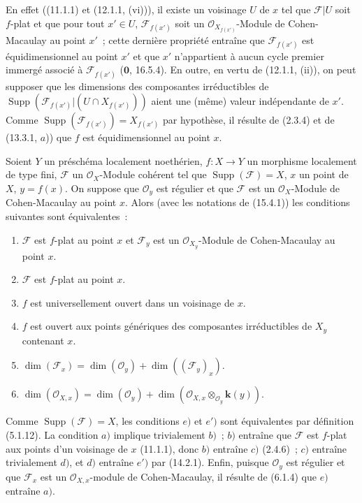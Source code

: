 En effet ((11.1.1) et (12.1.1, (vi))), il existe un voisinage $U$ de $x$ tel que
$\mathcal F|U$ soit $f$-plat et que pour tout $x'\in U$,
$\mathcal F_{f(x')}$ soit un $\mathcal O_{X_{f(x')}}$-Module de Cohen-Macaulay
au point $x'$~; cette dernière propriété entraîne que $\mathcal F_{f(x')}$ est
équidimensionnel au point $x'$ et que $x'$ n'appartient à aucun cycle premier
immergé associé à $\mathcal F_{f(x')}$ ($\mathbf{0}$, 16.5.4). En
outre, en vertu de (12.1.1, (ii)), on peut supposer que les dimensions des
composantes irréductibles de
$\operatorname{Supp}(\mathcal F_{f(x')}|(U\cap X_{f(x')}))$ aient une (même)
valeur indépendante de $x'$. Comme
$\operatorname{Supp}(\mathcal F_{f(x')})=X_{f(x')}$ par hypothèse, il résulte de
(2.3.4) et de (13.3.1, $a$)) que $f$ est équidimensionnel au point $x$.

\begin{proposition}[15.4.2]
Soient $Y$ un préschéma localement noethérien, $f:X\to Y$ un morphisme localement
de type fini, $\mathcal F$ un $\mathcal O_X$-Module cohérent tel que
$\operatorname{Supp}(\mathcal F)=X$, $x$ un point de $X$, $y=f(x)$. On suppose
que $\mathcal O_y$ est régulier et que $\mathcal F$ est un $\mathcal O_X$-Module
de Cohen-Macaulay au point $x$. Alors \textup{(avec les notations de (15.4.1))} les
conditions suivantes sont équivalentes~:
\begin{enumerate}[label=\emph{\alph*})]
  \item $\mathcal F$ est $f$-plat au point $x$ et $\mathcal F_y$ est un
  $\mathcal O_{X_y}$-Module de Cohen-Macaulay au point $x$.
  \item $\mathcal F$ est $f$-plat au point $x$.
  \item $f$ est universellement ouvert dans un voisinage de $x$.
  \item $f$ est ouvert aux points génériques des composantes irréductibles de
  $X_y$ contenant $x$.
  \item $\dim(\mathcal F_x)=\dim(\mathcal O_y)+\dim((\mathcal F_y)_x)$.
  \item[\emph{e}$'$)]
  $\dim(\mathcal O_{X,x})=\dim(\mathcal O_y)+
  \dim(\mathcal O_{X,x}\otimes_{\mathcal O_y}\boldsymbol{k}(y))$.
\end{enumerate}
\end{proposition}

Comme $\operatorname{Supp}(\mathcal F)=X$, les conditions $e)$ et $e')$ sont
équivalentes par définition (5.1.12). La condition $a)$ implique trivialement
$b)$~; $b)$ entraîne que $\mathcal F$ est $f$-plat aux points d'un voisinage de
$x$ (11.1.1), donc $b)$ entraîne $c)$ (2.4.6)~; $c)$ entraîne trivialement $d)$,
et $d)$ entraîne $e')$ par (14.2.1). Enfin, puisque $\mathcal O_y$ est régulier
et que $\mathcal F_x$ est un $\mathcal O_{X,x}$-module de Cohen-Macaulay, il
résulte de (6.1.4) que $e)$ entraîne $a)$.

